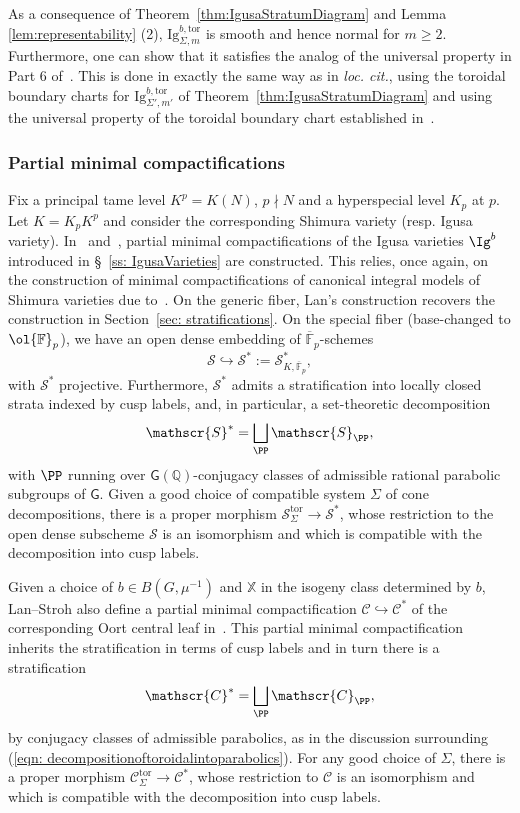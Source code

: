 \documentclass[letterpaper,11pt]{amsart}
\begin{document}
 As a consequence of Theorem~\ref{thm:IgusaStratumDiagram} and Lemma \ref{lem:representability} (2), $\mathrm{Ig}^{b,\mathrm{tor}}_{\Sigma,m}$ is smooth and hence normal for $m \geq 2$. Furthermore, one can show that it satisfies the analog of the universal property in Part 6 of~\cite[Theorem 6.4.1.1]{lan-thesis}. This is done in exactly the same way as in \emph{loc. cit.}, using the toroidal boundary charts for $\mathrm{Ig}^{b,\mathrm{tor}}_{\Sigma', m'}$ of Theorem~\ref{thm:IgusaStratumDiagram} and using the universal property of the toroidal boundary chart established in~\cite[Prop. 6.2.5.11]{lan-thesis}. 

\subsubsection{Partial minimal compactifications}{\label{ss: partialminimalcompactifications}}

Fix a principal tame level $K^p=K(N)$, $p\nmid N$ and a hyperspecial level $K_p$ at $p$. Let $K=K_pK^p$ and consider the corresponding Shimura variety (resp. Igusa variety). In~\cite[\S 3.3]{CS2} and~\cite[\S 3.3]{santos}, partial minimal compactifications of the Igusa varieties $\Ig^{b}$ introduced in \S~\ref{ss: IgusaVarieties} are constructed. This relies, once again, on the construction of  minimal compactifications of canonical integral models of Shimura varieties due to~\cite{lan-thesis}. On the generic fiber, Lan's construction recovers the construction in Section~\ref{sec: stratifications}. On the special fiber (base-changed to $\ol{\mathbb{F}}_p$), we have an open dense embedding of $\overline{\mathbb{F}}_p$-schemes
\[
\mathscr{S}\hookrightarrow\mathscr{S}^*:= \mathscr{S}^*_{K, \overline{\mathbb{F}}_p},
\] 
with $\mathscr{S}^*$ projective. Furthermore, $\mathscr{S}^*$ admits a stratification into locally closed strata indexed by cusp labels, and, in particular, a set-theoretic decomposition
\[
\mathscr{S}^* = \bigsqcup_{\PP}\mathscr{S}_{\PP}, 
\]
with $\PP$ running over $\mathsf{G}(\mathbb{Q})$-conjugacy classes of admissible rational parabolic subgroups of $\mathsf{G}$. Given a good choice of compatible system $\Sigma$ of cone decompositions, there is a proper morphism $\mathscr{S}^{\mathrm{tor}}_{\Sigma}\to \mathscr{S}^*$, whose restriction to the open dense subscheme $\mathscr{S}$ is an isomorphism and which is compatible with the decomposition into cusp labels.  

Given a choice of $b\in B(G,\mu^{-1})$ and $\mathbb{X}$ in the isogeny class determined by $b$, Lan--Stroh also define a partial minimal compactification $\mathscr{C}\hookrightarrow\mathscr{C}^*$ of the corresponding Oort central leaf in~\cite[\S 3.4]{LanStroh}. This partial minimal compactification inherits the stratification in terms of cusp labels and in turn there is a stratification 
\[
\mathscr{C}^* = \bigsqcup_{\PP} \mathscr{C}_{\PP},
\]
by conjugacy classes of admissible parabolics, as in the discussion surrounding (\ref{eqn: decompositionoftoroidalintoparabolics}). 
For any good choice of $\Sigma$, there is a proper morphism $\mathscr{C}^{\mathrm{tor}}_{\Sigma}\to \mathscr{C}^*$, whose restriction to $\mathscr{C}$ is an isomorphism and which is compatible with the decomposition into cusp labels.
\end{document}
